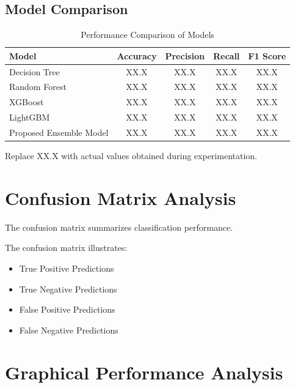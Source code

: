 \documentclass[12pt]{report}
\begin{document}
\subsection{Model Comparison}

\begin{table}[H]
\centering
\caption{Performance Comparison of Models}
\begin{tabular}{|l|c|c|c|c|}
\hline
Model & Accuracy & Precision & Recall & F1 Score \\
\hline
Decision Tree & XX.X & XX.X & XX.X & XX.X \\
\hline
Random Forest & XX.X & XX.X & XX.X & XX.X \\
\hline
XGBoost & XX.X & XX.X & XX.X & XX.X \\
\hline
LightGBM & XX.X & XX.X & XX.X & XX.X \\
\hline
Proposed Ensemble Model & XX.X & XX.X & XX.X & XX.X \\
\hline
\end{tabular}
\end{table}

Replace XX.X with actual values obtained during experimentation.

\section{Confusion Matrix Analysis}

The confusion matrix summarizes classification performance.


The confusion matrix illustrates:

\begin{itemize}
    \item True Positive Predictions
    \item True Negative Predictions
    \item False Positive Predictions
    \item False Negative Predictions
\end{itemize}

\section{Graphical Performance Analysis}
\end{document}
